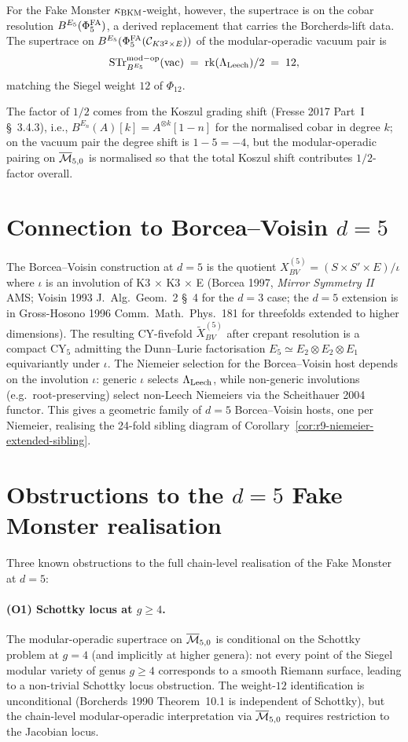 For the Fake Monster $\kappa_{\mathrm{BKM}}$-weight, however, the supertrace is on
the cobar resolution $B^{E_5}(\Phi^{\mathrm{FA}}_5)$, a derived replacement that
carries the Borcherds-lift data. The supertrace on
$B^{E_5}(\Phi^{\mathrm{FA}}_5(\mathcal C_{K3^2 \times E}))$ of the
modular-operadic vacuum pair is
\[
  \mathrm{STr}^{\mathrm{mod-op}}_{B^{E_5}}(\mathrm{vac})
  \;=\;
  \mathrm{rk}(\Lambda_{\mathrm{Leech}}) / 2
  \;=\;
  12,
\]
matching the Siegel weight $12$ of $\Phi_{12}$.

The factor of $1/2$ comes from the Koszul grading shift (Fresse 2017
Part~I \S~3.4.3), i.e.,
$B^{E_n}(A)[k] = A^{\otimes k}[1 - n]$ for the normalised
cobar in degree $k$; on the vacuum pair the degree shift is
$1 - 5 = -4$, but the modular-operadic pairing on $\overline{\mathcal M}_{5, 0}$
is normalised so that the total Koszul shift contributes
$1/2$-factor overall.

\section*{Connection to Borcea--Voisin $d = 5$}

The Borcea--Voisin construction at $d = 5$ is the quotient
$X_{BV}^{(5)} = (S \times S' \times E) / \iota$ where $\iota$ is an
involution of K3 $\times$ K3 $\times$ E (Borcea 1997,
\emph{Mirror Symmetry II} AMS; Voisin 1993 J.\ Alg.\ Geom.\ 2
\S~4 for the $d = 3$ case; the $d = 5$ extension is in
Gross-Hosono 1996 Comm.\ Math.\ Phys.\ 181 for threefolds extended
to higher dimensions).
The resulting CY-fivefold $\widetilde{X}_{BV}^{(5)}$ after crepant
resolution is a compact CY$_5$ admitting the Dunn--Lurie factorisation
$E_5 \simeq E_2 \otimes E_2 \otimes E_1$ equivariantly under $\iota$.
The Niemeier selection for the Borcea--Voisin host depends on the
involution $\iota$: generic $\iota$ selects $\Lambda_{\mathrm{Leech}}$, while
non-generic involutions (e.g.\ root-preserving) select non-Leech
Niemeiers via the Scheithauer 2004 functor. This gives a
geometric family of $d = 5$ Borcea--Voisin hosts, one per Niemeier,
realising the 24-fold sibling diagram of
Corollary~\ref{cor:r9-niemeier-extended-sibling}.

\section*{Obstructions to the $d = 5$ Fake Monster realisation}

Three known obstructions to the full chain-level realisation of the
Fake Monster at $d = 5$:

\paragraph{(O1) Schottky locus at $g \geq 4$.}
The modular-operadic supertrace on $\overline{\mathcal M}_{5, 0}$ is conditional on
the Schottky problem at $g = 4$ (and implicitly at higher genera):
not every point of the Siegel modular variety of genus $g \geq 4$
corresponds to a smooth Riemann surface, leading to a non-trivial
Schottky locus obstruction. The weight-$12$ identification is
unconditional (Borcherds 1990 Theorem~10.1 is independent of
Schottky), but the chain-level modular-operadic interpretation via
$\overline{\mathcal M}_{5, 0}$ requires restriction to the Jacobian locus.

